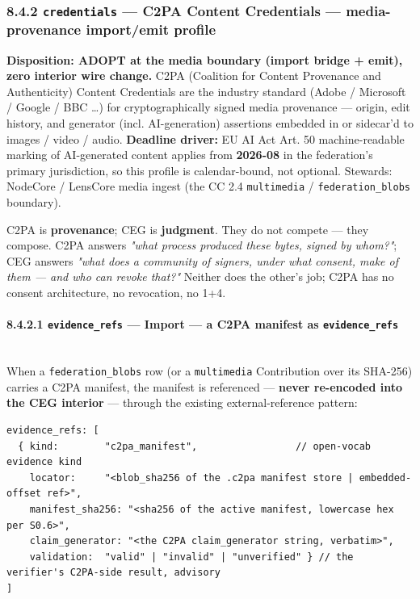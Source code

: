 \documentclass[11pt]{article}
\begin{document}
\subsubsection*{8.4.2 \texttt{credentials} — C2PA Content Credentials — media-provenance import/emit profile}


\textbf{Disposition: ADOPT at the media boundary (import bridge + emit), zero interior wire change.} C2PA (Coalition for Content Provenance and Authenticity) Content Credentials are the industry standard (Adobe / Microsoft / Google / BBC …) for cryptographically signed media provenance — origin, edit history, and generator (incl. AI-generation) assertions embedded in or sidecar'd to images / video / audio. \textbf{Deadline driver:} EU AI Act Art. 50 machine-readable marking of AI-generated content applies from \textbf{2026-08} in the federation's primary jurisdiction, so this profile is calendar-bound, not optional. Stewards: NodeCore / LensCore media ingest (the CC 2.4 \texttt{multimedia} / \texttt{federation\_blobs} boundary).


C2PA is \textbf{provenance}; CEG is \textbf{judgment}. They do not compete — they compose. C2PA answers \textit{"what process produced these bytes, signed by whom?"}; CEG answers \textit{"what does a community of signers, under what consent, make of them — and who can revoke that?"} Neither does the other's job; C2PA has no consent architecture, no revocation, no 1+4.


\paragraph{8.4.2.1 \texttt{evidence\_refs} — Import — a C2PA manifest as \texttt{evidence\_refs}}\mbox{}\\


When a \texttt{federation\_blobs} row (or a \texttt{multimedia} Contribution over its SHA-256) carries a C2PA manifest, the manifest is referenced — \textbf{never re-encoded into the CEG interior} — through the existing external-reference pattern:


\begin{lstlisting}
evidence_refs: [
  { kind:        "c2pa_manifest",                 // open-vocab evidence kind
    locator:     "<blob_sha256 of the .c2pa manifest store | embedded-offset ref>",
    manifest_sha256: "<sha256 of the active manifest, lowercase hex per S0.6>",
    claim_generator: "<the C2PA claim_generator string, verbatim>",
    validation:  "valid" | "invalid" | "unverified" } // the verifier's C2PA-side result, advisory
]
\end{lstlisting}
\end{document}
